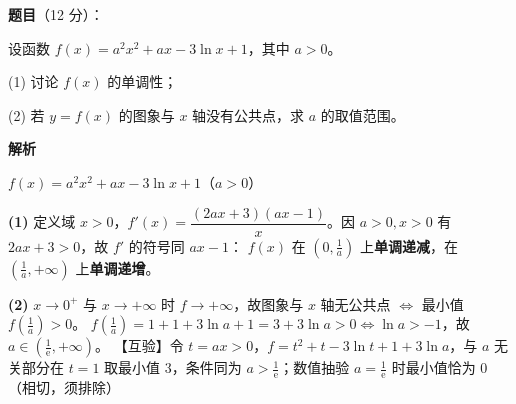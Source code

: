 \begin{answer}

\textbf{题目}（12 分）：

设函数 $f(x)=a^{2}x^{2}+ax-3\ln x+1$，其中 $a>0$。

  (1) 讨论 $f(x)$ 的单调性；

  (2) 若 $y=f(x)$ 的图象与 $x$ 轴没有公共点，求 $a$ 的取值范围。

\textbf{解析}

$f(x)=a^2x^2+ax-3\ln x+1$（$a>0$）

\begin{gktip}
\textbf{(1)} 定义域 $x>0$，$f'(x)=\dfrac{(2ax+3)(ax-1)}x$。因 $a>0,x>0$ 有 $2ax+3>0$，故 $f'$ 的符号同 $ax-1$：
$f(x)$ 在 $\left(0,\tfrac1a\right)$ 上\textbf{单调递减}，在 $\left(\tfrac1a,+\infty\right)$ 上\textbf{单调递增}。

\textbf{(2)} $x\to0^+$ 与 $x\to+\infty$ 时 $f\to+\infty$，故图象与 $x$ 轴无公共点 $\iff$ 最小值 $f\left(\tfrac1a\right)>0$。
$f\left(\tfrac1a\right)=1+1+3\ln a+1=3+3\ln a>0\iff\ln a>-1$，故 $\boxed{a\in\left(\tfrac1{\mathrm e},+\infty\right)}$。
【互验】令 $t=ax>0$，$f=t^2+t-3\ln t+1+3\ln a$，与 $a$ 无关部分在 $t=1$ 取最小值 $3$，条件同为 $a>\tfrac1{\mathrm e}$；数值抽验 $a=\tfrac1{\mathrm e}$ 时最小值恰为 $0$（相切，须排除）
\end{gktip}



\end{answer}
